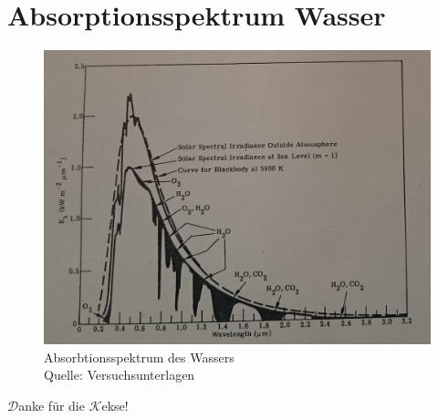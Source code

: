 
	\FloatBarrier
	\newpage

	\section{Absorptionsspektrum Wasser} %
	\label{sec:absorptionsspektrum_wasser}
	
		\begin{figure}[htb]
			\centering
			\includegraphics[scale=0.25]{images/h2o-spec.png}
			\caption{Absorbtionsspektrum des Wassers \\ Quelle: Versuchsunterlagen}
			\label{fig:}
		\end{figure}


	\FloatBarrier

	\newpage
	\pagestyle{empty}
	\vspace*{\fill}
	\centering $\mathscr{D}$anke für die $\mathscr{K}$ekse!
	\vspace*{\fill}

